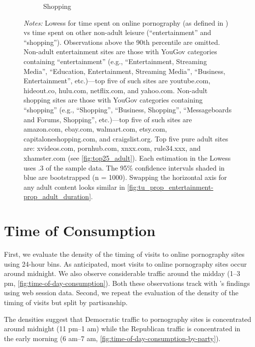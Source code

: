 \documentclass[12pt, letterpaper]{article}
\begin{document}
\begin{figure}[ht]
\begin{subfigure}[b]{0.495\textwidth}
         \caption{Shopping}
     \end{subfigure}
\caption*{\footnotesize \emph{Notes:}
Lowess for time spent on online pornography (as defined in ) vs time spent on other non-adult leisure (``entertainment'' and ``shopping'').
Observations above the 90th percentile are omitted. 
Non-adult entertainment sites are those with YouGov categories containing ``entertainment'' (e.g., ``Entertainment, Streaming Media'', ``Education, Entertainment, Streaming Media'', ``Business, Entertainment'', etc.)---top five of such sites are youtube.com, hideout.co, hulu.com, netflix.com, and yahoo.com.
Non-adult shopping sites are those with YouGov categories containing ``shopping'' (e.g., ``Shopping'', ``Business, Shopping'', ``Messageboards and Forums, Shopping'', etc.)---top five of such sites are amazon.com, ebay.com, walmart.com, etsy.com, capitaloneshopping.com, and craigslist.org.
Top five pure adult sites are: xvideos.com, pornhub.com, xnxx.com, rule34.xxx, and xhamster.com (see \cref{fig:top25_adult}).
Each estimation in the Lowess uses .3 of the sample data.
The 95\% confidence intervals shaded in blue are bootstrapped (n = 1000).
Swapping the horizontal axis for any adult content looks similar in \cref{fig:tu_prop_entertainment-prop_adult_duration}. 
}
\end{figure}

\FloatBarrier
\clearpage
\section{Time of Consumption}
\label{si:time_of_consumption}

First, we evaluate the density of the timing of visits to online pornography sites using 24-hour bins. As anticipated, most visits to online pornography sites occur around midnight. We also observe considerable traffic around the midday (1--3 pm, \cref{fig:time-of-day-consumption}). Both these observations track with \cite{webporn}'s findings using web session data. Second, we repeat the evaluation of the density of the timing of visits but split by partisanship.

The densities suggest that Democratic traffic to pornography sites is concentrated around midnight (11 pm--1 am) while the Republican traffic is concentrated in the early morning (6 am--7 am, \cref{fig:time-of-day-consumption-by-party}).
\end{document}
